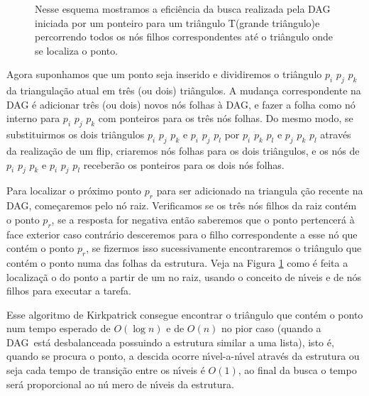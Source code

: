 \documentclass[12pt,a4paper]{book}
\begin{document}
\begin{figure}[htbp]
  \begin{center}
    \leavevmode
    
    \caption{Nesse esquema mostramos a efici\^{e}ncia da busca realizada pela DAG
             iniciada por um ponteiro para um tri\^{a}ngulo T(grande tri\^{a}ngulo)e 
	     percorrendo todos os n\'{o}s filhos correspondentes at\'{e} o tri\^{a}ngulo 
	     onde se localiza o ponto.}
    \label{fig14_chapter6}
  \end{center}
\end{figure}


Agora suponhamos que um ponto seja inserido e dividiremos o tri\^{a}ngulo $%
p_{i}$ $p_{j}$ $p_{k}$ da triangula\c{c}\~{a}o atual em tr\^{e}s (ou dois)
tri\^{a}ngulos. A mudan\c{c}a correspondente na DAG \'{e} adicionar tr\^{e}s (ou
dois) novos n\'{o}s folhas \`{a} DAG, e fazer a folha como n\'{o} interno
para $p_{i}$ $p_{j}$ $p_{k}$ com ponteiros para os tr\^{e}s n\'{o}s folhas.
Do mesmo modo, se substituirmos os dois tri\^{a}ngulos $p_{i}$ $p_{j}$ $p_{k}
$ e $p_{i}$ $p_{j}$ $p_{l}$ por $p_{i}$ $p_{k}$ $p_{l}$ e $p_{j}$ $p_{k}$ $%
p_{l}$ atrav\'{e}s da realiza\c{c}\~{a}o de um flip, criaremos n\'{o}s
folhas para os dois tri\^{a}ngulos, e os n\'{o}s de $p_{i}$ $p_{j}$ $p_{k}$
e $p_{i}$ $p_{j}$ $p_{l}$ receber\~{a}o os ponteiros para os dois n\'{o}s
folhas.

Para localizar o pr\'{o}ximo ponto $p_{r}$ para ser adicionado na triangula%
\c{c}\~{a}o recente na DAG, come\c{c}aremos pelo n\'{o} raiz. Verificamos se
os tr\^{e}s n\'{o}s filhos da raiz cont\'{e}m o ponto  $p_{r}$, se
a resposta for negativa ent\~{a}o saberemos que o ponto pertencer\'{a} \`{a}
face exterior caso contr\'{a}rio desceremos para o filho correspondente a esse n\'{o} que
cont\'{e}m o ponto $p_{r}$, se fizermos isso sucessivamente encontraremos o
tri\^{a}ngulo que cont\'{e}m o ponto numa das folhas da estrutura. 
Veja na Figura \ref{fig14_chapter6} como \'{e} feita a localiza\c{c}\~{a}%
o do ponto a partir de um no raiz, usando o conceito de n\'{\i}veis e de n\'{o}s
filhos para executar a tarefa.

Esse algoritmo de Kirkpatrick \cite{kirk83} consegue encontrar o tri\^{a}ngulo que
cont\'{e}m o ponto num tempo esperado de $O(\log n)$ e de $%
O(n)$ no pior caso (quando a DAG\ est\'{a} desbalanceada
possuindo a estrutura similar a uma lista), isto \'{e}, quando se
procura o ponto, a descida ocorre n\'{\i}vel-a-n\'{\i}vel atrav\'{e}s da
estrutura ou seja cada tempo de transi\c{c}\~{a}o entre os n\'{\i}veis \'{e} 
$O(1)$, ao final da busca o tempo ser\'{a} proporcional ao n\'{u}%
mero de n\'{\i}veis da estrutura.
\end{document}
